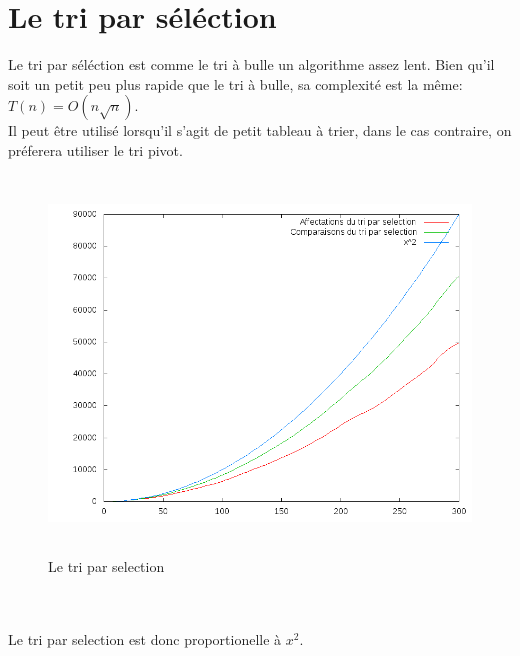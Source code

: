 \documentclass[12pt,a4paper,openany]{article}
\begin{document}
	\section{Le tri par séléction}
		Le tri par séléction est comme le tri à bulle un algorithme assez lent. Bien qu'il soit un petit peu plus rapide que le tri à bulle, sa complexité est la même: $T(n) = O(n\sqrt{n})$. \\
		Il peut être utilisé lorsqu'il s'agit de petit tableau à trier, dans le cas contraire, on préferera utiliser le tri pivot.
		\begin{figure}[!h] 
			\includegraphics[height=10cm]{triSelection.png}										
			\caption{Le tri par selection}
		\end{figure}\\ \\
		Le tri par selection est donc proportionelle à $x^{2}$.
	
		\newpage
\end{document}

